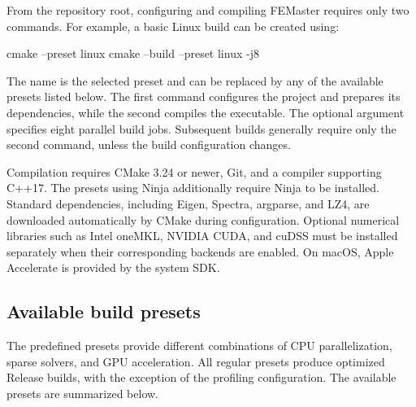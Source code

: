 From the repository root, configuring and compiling FEMaster requires
only two commands. For example, a basic Linux build can be created
using:

\begin{shellcmd}
cmake --preset linux
cmake --build --preset linux -j8
\end{shellcmd}

The name  is the selected preset and can be replaced by any
of the available presets listed below. The first command configures
the project and prepares its dependencies, while the second compiles
the executable. The optional argument  specifies eight
parallel build jobs. Subsequent builds generally require only the
second command, unless the build configuration changes.

Compilation requires CMake 3.24 or newer, Git, and a compiler supporting
C++17. The presets using Ninja additionally require Ninja to be
installed. Standard dependencies, including Eigen, Spectra, argparse,
and LZ4, are downloaded automatically by CMake during configuration.
Optional numerical libraries such as Intel oneMKL, NVIDIA CUDA, and
cuDSS must be installed separately when their corresponding backends
are enabled. On macOS, Apple Accelerate is provided by the system SDK.


\subsection{Available build presets}

The predefined presets provide different combinations of CPU
parallelization, sparse solvers, and GPU acceleration. All regular
presets produce optimized Release builds, with the exception of the
profiling configuration. The available presets are summarized below.

